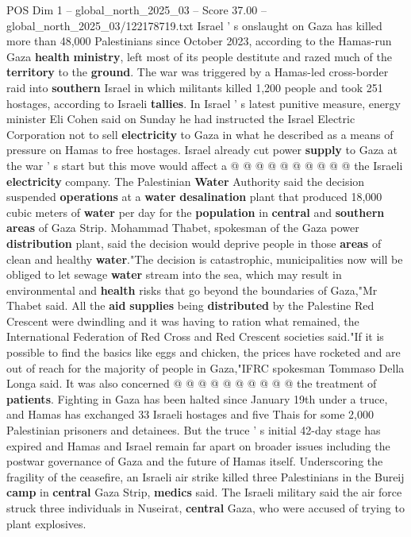 \begin{textsample}{POS Dim 1 – global\_north\_2025\_03 – Score 37.00 – global\_north\_2025\_03/122178719.txt}
Israel ' s onslaught on Gaza has killed more than 48,000 Palestinians since October 2023, according to the Hamas-run Gaza \textbf{health} \textbf{ministry}, left most of its people destitute and razed much of the \textbf{territory} to the \textbf{ground}.
The war was triggered by a Hamas-led cross-border raid into \textbf{southern} Israel in which militants killed 1,200 people and took 251 hostages, according to Israeli \textbf{tallies}.
In Israel ' s latest punitive measure, energy minister Eli Cohen said on Sunday he had instructed the Israel Electric Corporation not to sell \textbf{electricity} to Gaza in what he described as a means of pressure on Hamas to free hostages.
Israel already cut power \textbf{supply} to Gaza at the war ' s start but this move would affect a @ @ @ @ @ @ @ @ @ @ the Israeli \textbf{electricity} company.
The Palestinian \textbf{Water} Authority said the decision suspended \textbf{operations} at a \textbf{water} \textbf{desalination} plant that produced 18,000 cubic meters of \textbf{water} per day for the \textbf{population} in \textbf{central} and \textbf{southern} \textbf{areas} of Gaza Strip.
Mohammad Thabet, spokesman of the Gaza power \textbf{distribution} plant, said the decision would deprive people in those \textbf{areas} of clean and healthy \textbf{water}."The decision is catastrophic, municipalities now will be obliged to let sewage \textbf{water} stream into the sea, which may result in environmental and \textbf{health} risks that go beyond the boundaries of Gaza,"Mr Thabet said.
All the \textbf{aid} \textbf{supplies} being \textbf{distributed} by the Palestine Red Crescent were dwindling and it was having to ration what remained, the International Federation of Red Cross and Red Crescent societies said."If it is possible to find the basics like eggs and chicken, the prices have rocketed and are out of reach for the majority of people in Gaza,"IFRC spokesman Tommaso Della Longa said.
It was also concerned @ @ @ @ @ @ @ @ @ @ the treatment of \textbf{patients}.
Fighting in Gaza has been halted since January 19th under a truce, and Hamas has exchanged 33 Israeli hostages and five Thais for some 2,000 Palestinian prisoners and detainees.
But the truce ' s initial 42-day stage has expired and Hamas and Israel remain far apart on broader issues including the postwar governance of Gaza and the future of Hamas itself.
Underscoring the fragility of the ceasefire, an Israeli air strike killed three Palestinians in the Bureij \textbf{camp} in \textbf{central} Gaza Strip, \textbf{medics} said.
The Israeli military said the air force struck three individuals in Nuseirat, \textbf{central} Gaza, who were accused of trying to plant explosives.

\end{textsample}
